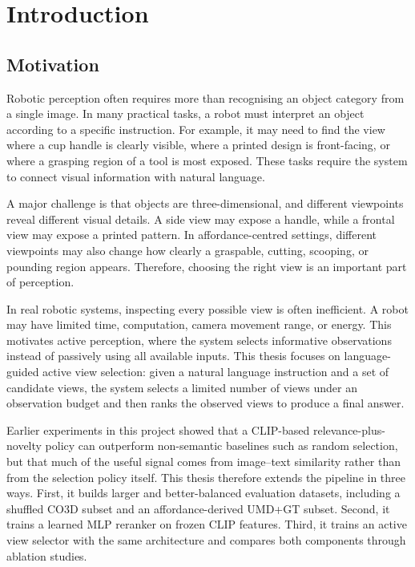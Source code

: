 \chapter{Introduction}
\label{chap:introduction}

\section{Motivation}

Robotic perception often requires more than recognising an object category from a single image. In many practical tasks, a robot must interpret an object according to a specific instruction. For example, it may need to find the view where a cup handle is clearly visible, where a printed design is front-facing, or where a grasping region of a tool is most exposed. These tasks require the system to connect visual information with natural language.

A major challenge is that objects are three-dimensional, and different viewpoints reveal different visual details. A side view may expose a handle, while a frontal view may expose a printed pattern. In affordance-centred settings, different viewpoints may also change how clearly a graspable, cutting, scooping, or pounding region appears. Therefore, choosing the right view is an important part of perception.

In real robotic systems, inspecting every possible view is often inefficient. A robot may have limited time, computation, camera movement range, or energy. This motivates active perception, where the system selects informative observations instead of passively using all available inputs. This thesis focuses on language-guided active view selection: given a natural language instruction and a set of candidate views, the system selects a limited number of views under an observation budget and then ranks the observed views to produce a final answer.

Earlier experiments in this project showed that a CLIP-based relevance-plus-novelty policy can outperform non-semantic baselines such as random selection, but that much of the useful signal comes from image--text similarity rather than from the selection policy itself. This thesis therefore extends the pipeline in three ways. First, it builds larger and better-balanced evaluation datasets, including a shuffled CO3D subset and an affordance-derived UMD+GT subset. Second, it trains a learned MLP reranker on frozen CLIP features. Third, it trains an active view selector with the same architecture and compares both components through ablation studies.

